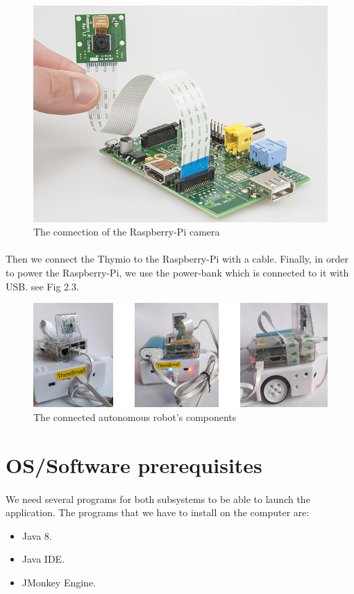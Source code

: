 \documentclass[12pt]{report}
\begin{document}
\begin{figure}[H]
	\begin{center}
		\includegraphics[scale=0.8]{campirasp.png}
		\caption{The connection of the Raspberry-Pi camera }
	\end{center}
\end{figure}
\paragraph{}
Then we connect the Thymio to the Raspberry-Pi with a cable. Finally, in order to power the Raspberry-Pi, we use the power-bank which is connected to it with USB. see Fig 2.3.
\begin{figure}[H]
	\begin{center}
		\includegraphics[scale=0.8]{robot_comp.png}
		\caption{The connected autonomous robot's components}
	\end{center}
\end{figure}
\section{OS/Software prerequisites}
\paragraph{}
We need several programs for both subsystems to be able to launch the application. The programs that we have to install on the computer are:
\begin{itemize}
	\item Java 8.
	\item Java IDE.
	\item JMonkey Engine.
\end{itemize}
\end{document}
